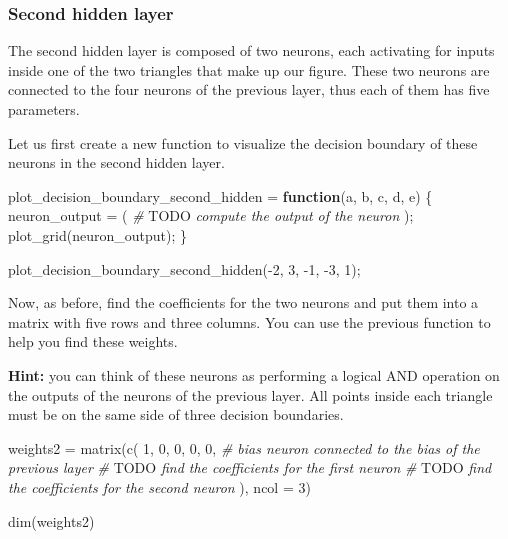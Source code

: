 \documentclass[
]{article}
\newenvironment{Shaded}{\begin{snugshade}}{\end{snugshade}}
\newcommand{\AlertTok}[1]{\textcolor[rgb]{0.94,0.16,0.16}{#1}}
\newcommand{\AttributeTok}[1]{\textcolor[rgb]{0.77,0.63,0.00}{#1}}
\newcommand{\CommentTok}[1]{\textcolor[rgb]{0.56,0.35,0.01}{\textit{#1}}}
\newcommand{\ControlFlowTok}[1]{\textcolor[rgb]{0.13,0.29,0.53}{\textbf{#1}}}
\newcommand{\DecValTok}[1]{\textcolor[rgb]{0.00,0.00,0.81}{#1}}
\newcommand{\FunctionTok}[1]{\textcolor[rgb]{0.00,0.00,0.00}{#1}}
\newcommand{\NormalTok}[1]{#1}
\newcommand{\OtherTok}[1]{\textcolor[rgb]{0.56,0.35,0.01}{#1}}
\newcommand{\SpecialCharTok}[1]{\textcolor[rgb]{0.00,0.00,0.00}{#1}}
\begin{document}
\hypertarget{second-hidden-layer}{%
\subsubsection{Second hidden layer}\label{second-hidden-layer}}

The second hidden layer is composed of two neurons, each activating for
inputs inside one of the two triangles that make up our figure. These
two neurons are connected to the four neurons of the previous layer,
thus each of them has five parameters.

Let us first create a new function to visualize the decision boundary of
these neurons in the second hidden layer.

\begin{Shaded}
\begin{Highlighting}[]
\NormalTok{plot\_decision\_boundary\_second\_hidden }\OtherTok{=} \ControlFlowTok{function}\NormalTok{(a, b, c, d, e) \{}
\NormalTok{  neuron\_output }\OtherTok{=}\NormalTok{ (}
    \CommentTok{\# }\AlertTok{TODO}\CommentTok{ compute the output of the neuron}
\NormalTok{  );}
  \FunctionTok{plot\_grid}\NormalTok{(neuron\_output);}
\NormalTok{\}}

\FunctionTok{plot\_decision\_boundary\_second\_hidden}\NormalTok{(}\SpecialCharTok{{-}}\DecValTok{2}\NormalTok{, }\DecValTok{3}\NormalTok{, }\SpecialCharTok{{-}}\DecValTok{1}\NormalTok{, }\SpecialCharTok{{-}}\DecValTok{3}\NormalTok{, }\DecValTok{1}\NormalTok{);}
\end{Highlighting}
\end{Shaded}

Now, as before, find the coefficients for the two neurons and put them
into a matrix with five rows and three columns. You can use the previous
function to help you find these weights.

\textbf{Hint:} you can think of these neurons as performing a logical
AND operation on the outputs of the neurons of the previous layer. All
points inside each triangle must be on the same side of three decision
boundaries.

\begin{Shaded}
\begin{Highlighting}[]
\NormalTok{weights2 }\OtherTok{=} \FunctionTok{matrix}\NormalTok{(}\FunctionTok{c}\NormalTok{(}
  \DecValTok{1}\NormalTok{, }\DecValTok{0}\NormalTok{, }\DecValTok{0}\NormalTok{, }\DecValTok{0}\NormalTok{, }\DecValTok{0}\NormalTok{,  }\CommentTok{\# bias neuron connected to the bias of the previous layer}
  \CommentTok{\# }\AlertTok{TODO}\CommentTok{ find the coefficients for the first neuron}
  \CommentTok{\# }\AlertTok{TODO}\CommentTok{ find the coefficients for the second neuron}
\NormalTok{), }\AttributeTok{ncol =} \DecValTok{3}\NormalTok{)}

\FunctionTok{dim}\NormalTok{(weights2)}
\end{Highlighting}
\end{Shaded}
\end{document}

